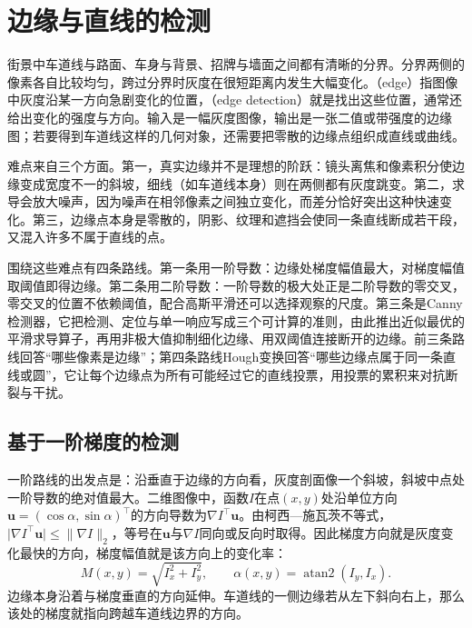 \section{边缘与直线的检测}
\label{sec:vision-features-edges}

街景中车道线与路面、车身与背景、招牌与墙面之间都有清晰的分界。分界两侧的像素各自比较均匀，跨过分界时灰度在很短距离内发生大幅变化。（edge）指图像中灰度沿某一方向急剧变化的位置，（edge detection）就是找出这些位置，通常还给出变化的强度与方向。输入是一幅灰度图像，输出是一张二值或带强度的边缘图；若要得到车道线这样的几何对象，还需要把零散的边缘点组织成直线或曲线。

难点来自三个方面。第一，真实边缘并不是理想的阶跃：镜头离焦和像素积分使边缘变成宽度不一的斜坡，细线（如车道线本身）则在两侧都有灰度跳变。第二，求导会放大噪声，因为噪声在相邻像素之间独立变化，而差分恰好突出这种快速变化。第三，边缘点本身是零散的，阴影、纹理和遮挡会使同一条直线断成若干段，又混入许多不属于直线的点。

围绕这些难点有四条路线。第一条用一阶导数：边缘处梯度幅值最大，对梯度幅值取阈值即得边缘。第二条用二阶导数：一阶导数的极大处正是二阶导数的零交叉，零交叉的位置不依赖阈值，配合高斯平滑还可以选择观察的尺度。第三条是Canny检测器，它把检测、定位与单一响应写成三个可计算的准则，由此推出近似最优的平滑求导算子，再用非极大值抑制细化边缘、用双阈值连接断开的边缘。前三条路线回答“哪些像素是边缘”；第四条路线Hough变换回答“哪些边缘点属于同一条直线或圆”，它让每个边缘点为所有可能经过它的直线投票，用投票的累积来对抗断裂与干扰。

\subsection{基于一阶梯度的检测}
\label{sec:vision-features-gradient-edges}

一阶路线的出发点是：沿垂直于边缘的方向看，灰度剖面像一个斜坡，斜坡中点处一阶导数的绝对值最大。二维图像中，函数$I$在点$(x,y)$处沿单位方向$\bm u=(\cos\alpha,\sin\alpha)^{\top}$的方向导数为$\nabla I^{\top}\bm u$。由柯西—施瓦茨不等式，$\lvert\nabla I^{\top}\bm u\rvert\leq\lVert\nabla I\rVert_2$，等号在$\bm u$与$\nabla I$同向或反向时取得。因此梯度方向就是灰度变化最快的方向，梯度幅值就是该方向上的变化率：
\begin{equation}
  M(x,y)=\sqrt{I_x^2+I_y^2},\qquad
  \alpha(x,y)=\operatorname{atan2}(I_y,I_x).
  \label{eq:vision-features-gradient-magnitude}
\end{equation}
边缘本身沿着与梯度垂直的方向延伸。车道线的一侧边缘若从左下斜向右上，那么该处的梯度就指向跨越车道线边界的方向。


